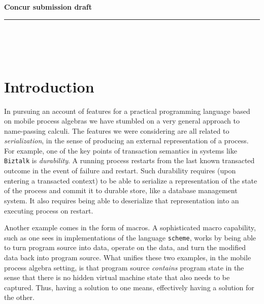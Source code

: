 \documentclass{amsart}
\theoremstyle{definition}
\theoremstyle{remark}
\numberwithin{equation}{subsection}
\newcommand{\paperversion}{Draft Version 0.1 - December 30, 2003}
\newenvironment{toc}
{
\begin{list}{}{
   \setlength{\leftmargin}{0.4in}
   \setlength{\rightmargin}{0.6in}
   \setlength{\parskip}{0pt}
 } \item }
{\end{list}}
\begin{document}
\noindent
{\large \textbf{
Concur submission draft}}\\
\rule{6.25in}{0.75pt}\\\\\\

\maketitle




\section{Introduction}

In pursuing an account of features for a practical programming
language based on mobile process algebras we have stumbled on a very
general approach to name-passing calculi. The features we were
considering are all related to \textit{serialization}, in the sense of
producing an external representation of a process. For example, one of
the key points of transaction semantics in systems like \texttt{Biztalk} is
\textit{durability}. A running process restarts from the last known
transacted outcome in the event of failure and restart. Such
durability requires (upon entering a transacted context) to be able to
serialize a representation of the state of the process and commit it
to durable store, like a database management system. It also requires
being able to deserialize that representation into an executing
process on restart.
 
Another example comes in the form of macros. A sophisticated macro
capability, such as one sees in implementations of the language
\texttt{scheme}, works by being able to turn program source into data,
operate on the data, and turn the modified data back into program
source. What unifies these two examples, in the mobile process algebra
setting, is that program source \textit{contains} program state in the
sense that there is no hidden virtual machine state that also needs to
be captured. Thus, having a solution to one means, effectively having
a solution for the other.
\end{document}
